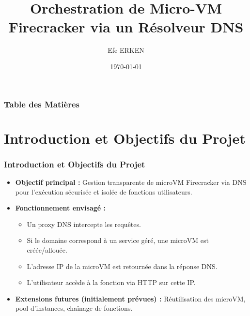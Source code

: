 \documentclass[12pt]{beamer}
\title{Orchestration de Micro-VM Firecracker via un Résolveur DNS}
\author{Efe ERKEN}
\institute{Master Informatique - Parcours SAR \\ Sorbonne Université}
\date{\today}
\begin{document}
	\begin{frame}
		\titlepage
	\end{frame}

	\begin{frame}
	  \frametitle{Table des Matières}
	  \tableofcontents
	\end{frame}

    \section{Introduction et Objectifs du Projet}
	\begin{frame}
		\frametitle{Introduction et Objectifs du Projet}
		\begin{itemize}
			\item \textbf{Objectif principal :} Gestion transparente de microVM Firecracker via DNS pour l'exécution sécurisée et isolée de fonctions utilisateurs.
			\item \textbf{Fonctionnement envisagé :}
			\begin{itemize}
				\item Un proxy DNS intercepte les requêtes.
				\item Si le domaine correspond à un service géré, une microVM est créée/allouée.
				\item L'adresse IP de la microVM est retournée dans la réponse DNS.
				\item L'utilisateur accède à la fonction via HTTP sur cette IP.
			\end{itemize}
			\item \textbf{Extensions futures (initialement prévues) :} Réutilisation des microVM, pool d'instances, chaînage de fonctions.
		\end{itemize}
	\end{frame}

\end{document}
